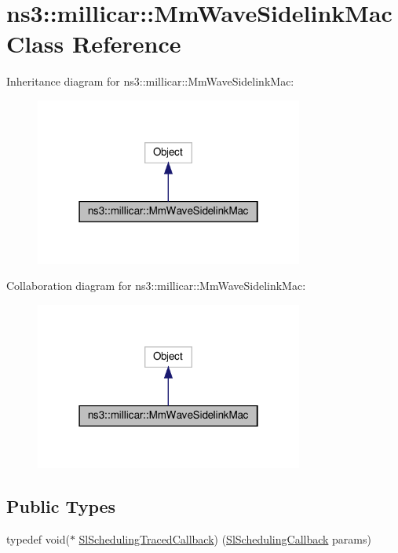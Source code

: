 \hypertarget{classns3_1_1millicar_1_1MmWaveSidelinkMac}{}\section{ns3\+:\+:millicar\+:\+:Mm\+Wave\+Sidelink\+Mac Class Reference}
\label{classns3_1_1millicar_1_1MmWaveSidelinkMac}


Inheritance diagram for ns3\+:\+:millicar\+:\+:Mm\+Wave\+Sidelink\+Mac\+:\nopagebreak
\begin{figure}[H]
\begin{center}
\leavevmode
\includegraphics[width=250pt]{classns3_1_1millicar_1_1MmWaveSidelinkMac__inherit__graph}
\end{center}
\end{figure}


Collaboration diagram for ns3\+:\+:millicar\+:\+:Mm\+Wave\+Sidelink\+Mac\+:\nopagebreak
\begin{figure}[H]
\begin{center}
\leavevmode
\includegraphics[width=250pt]{classns3_1_1millicar_1_1MmWaveSidelinkMac__coll__graph}
\end{center}
\end{figure}
\subsection*{Public Types}
\begin{DoxyCompactItemize}
\item 
typedef void($\ast$ \hyperlink{classns3_1_1millicar_1_1MmWaveSidelinkMac_ad5c7416a57edcebe1e57106b503831c7}{Sl\+Scheduling\+Traced\+Callback}) (\hyperlink{structns3_1_1millicar_1_1SlSchedulingCallback}{Sl\+Scheduling\+Callback} params)
\end{DoxyCompactItemize}
